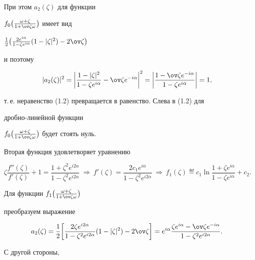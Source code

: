 При этом $a_2(\zeta)$ для функции 


$f_0\big(\frac{\omega+\zeta}{1+\ov\zeta\omega}\big)$ имеет вид 


$\frac{1}{2}\big(\frac{2e^{i\alpha}}{1-\zeta e^{i\alpha}} 


(1-|\zeta|^2)-2\ov\zeta\big)$ 


и поэтому 


$$ 


|a_2(\zeta)|^2=\bigg|\frac{1-|\zeta|^2}{1-\zeta e^{i\alpha}} 


-\ov\zeta e^{-i\alpha}\bigg|^2=\bigg| 


\frac{1-\ov\zeta e^{-i\alpha}}{1-\zeta e^{i\alpha}}\bigg|=1, 


$$ 


т.\,е. неравенство (1.2) превращается в равенство. Слева в (1.2) для 


дробно-линейной функции 


$f_0\big(\frac{\omega+\zeta}{1+\ov\zeta\omega}\big)$ будет стоять нуль. 


 


Вторая функция удовлетворяет уравнению 


$$ 


\zeta\frac{f''(\zeta)}{f'(\zeta)}+1= 


\frac{1+\zeta^2e^{i2\alpha}}{1-\zeta^2e^{i2\alpha}} 


\ \Rightarrow \ f'(\zeta)=\frac{2c_1e^{i\alpha}} 


{1-\zeta^2e^{i2\alpha}}\ \Rightarrow \ f_1(\zeta)\eqdef 


c_1\ln\frac{1+\zeta e^{i\alpha}}{1-\zeta e^{i\alpha}}+c_2. 


$$ 


Для функции $f_1\big(\frac{\omega+\zeta}{1+\ov\zeta\omega}\big)$ 


преобразуем выражение 


$$ 


a_2(\zeta)=\frac{1}{2}\bigg[\frac{2\zeta e^{i2\alpha}} 


{1-\zeta^2e^{i2\alpha}}(1-|\zeta|^2)-2\ov\zeta\bigg]= 


e^{i\alpha}\frac{\zeta e^{i\alpha}-\ov\zeta e^{-i\alpha}} 


{1-\zeta^2e^{i2\alpha}}. 


$$ 


 


С другой стороны, 


$$ 


